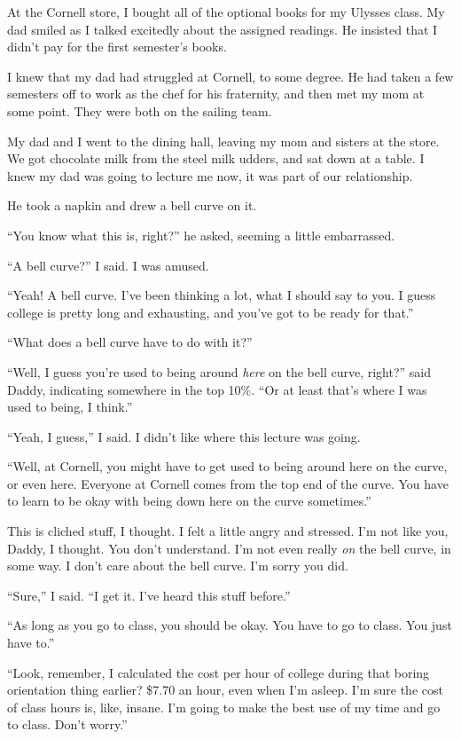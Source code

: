 At the Cornell store, I bought all of the optional books for my Ulysses class.
My dad smiled as I talked excitedly about the assigned readings.  He insisted
that I didn't pay for the first semester's books.

I knew that my dad had struggled at Cornell, to some degree.  He had taken a few
semesters off to work as the chef for his fraternity, and then met my mom at
some point.  They were both on the sailing team.

My dad and I went to the dining hall, leaving my mom and sisters at the store.
We got chocolate milk from the steel milk udders, and sat down at a table.  I
knew my dad was going to lecture me now, it was part of our relationship. 

He took a napkin and drew a bell curve on it.

``You know what this is, right?'' he asked, seeming a little embarrassed.

``A bell curve?'' I said.  I was amused.

``Yeah!  A bell curve.  I've been thinking a lot, what I should say to you.  I
guess college is pretty long and exhausting, and you've got to be ready for that.''  

``What does a bell curve have to do with it?''

``Well, I guess you're used to being around \textit{here} on the bell curve,
right?'' said Daddy, indicating somewhere in the top 10\%.  ``Or at least that's
where I was used to being, I think.''  

``Yeah, I guess,'' I said.  I didn't like where this lecture was going.

``Well, at Cornell, you might have to get used to being around here on the
curve, or even here.  Everyone at Cornell comes from the top end of the curve.
You have to learn to be okay with being down here on the curve sometimes.''

This is cliched stuff, I thought.  I felt a little angry and stressed.  I'm not
like you, Daddy, I thought.  You don't understand.  I'm not even really
\textit{on} the bell curve, in some way.  I don't care about the bell curve.
I'm sorry you did.

``Sure,'' I said.  ``I get it.  I've heard this stuff before.''

``As long as you go to class, you should be okay.  You have to go to class.  You
just have to.''

``Look, remember, I calculated the cost per hour of college during that boring
orientation thing earlier?  \$7.70 an hour, even when I'm asleep.  I'm sure the
cost of class hours is, like, insane.  I'm going to make the best use of my time
and go to class. Don't worry.''

